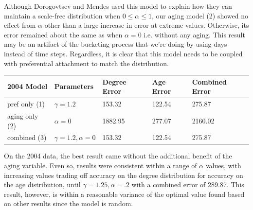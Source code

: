\documentclass[11pt]{amsart}
\begin{document}
Although Dorogovtsev and Mendes \cite{aging} used this model to explain how they can maintain a scale-free distribution when $0 \leq \alpha \leq 1$, our aging model (2) showed no effect from $\alpha$ other than a large increase in error at extreme values. Otherwise, its error remained about the same as when $\alpha=0$ i.e. without any aging. This result may be an artifact of the bucketing process that we're doing by using days instead of time steps. Regardless, it is clear that this model needs to be coupled with preferential attachment to match the distribution.

\vspace{10pt}
\begin{tabular}{| l | l | l | l | l |}
 \hline
2004 Model & Parameters & Degree Error & Age Error & Combined Error \\ \hline
pref only (1) & $\gamma = 1.2 $ & 153.32 & 122.54 & 275.87 \\ \hline
aging only (2) & $\alpha = 0 $ & 1882.95 & 277.07 & 2160.02 \\ \hline
combined (3) & $\gamma = 1.2, \alpha=0$ & 153.32 & 122.54 & 275.87 \\ \hline
\end{tabular}
\vspace{10pt}

On the 2004 data, the best result came without the additional benefit of the aging variable. Even so, results were consistent within a range of $\alpha$ values, with increasing values trading off accuracy on the degree distribution for accuracy on the age distribution, until $\gamma=1.25, \alpha=.2$ with a combined error of 289.87. This result, however, is within a reasonable variance of the optimal value found based on other results since the model is random.
\end{document}
